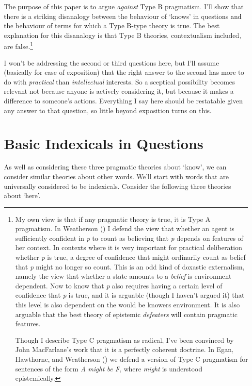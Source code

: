 \documentclass[
  10pt,
  letterpaper,
  DIV=11,
  numbers=noendperiod,
  twoside]{scrartcl}
\begin{document}
The purpose of this paper is to argue \emph{against} Type B pragmatism.
I'll show that there is a striking disanalogy between the behaviour of
`knows' in questions and the behaviour of terms for which a Type B-type
theory is true. The best explanation for this disanalogy is that Type B
theories, contextualism included, are false.\footnote{My own view is
  that if any pragmatic theory is true, it is Type A pragmatism. In
  Weatherson () I defend the
  view that whether an agent is sufficiently confident in \emph{p} to
  count as believing that \emph{p} depends on features of her context.
  In contexts where it is very important for practical deliberation
  whether \emph{p} is true, a degree of confidence that might ordinarily
  count as belief that \emph{p} might no longer so count. This is an odd
  kind of doxastic externalism, namely the view that whether a state
  amounts to a \emph{belief} is environment-dependent. Now to know that
  \emph{p} also requires having a certain level of confidence that
  \emph{p} is true, and it is arguable (though I haven't argued it) that
  this level is also dependent on the would be knowers environment. It
  is also arguable that the best theory of epistemic \emph{defeaters}
  will contain pragmatic features.

  Though I describe Type C pragmatism as radical, I've been convinced by
  John MacFarlane's work that it is a perfectly coherent doctrine. In
  Egan, Hawthorne, and Weatherson ()
  we defend a version of Type C pragmatism for sentences of the form
  \emph{A might be F}, where \emph{might} is understood epistemically.}

I won't be addressing the second or third questions here, but I'll
assume (basically for ease of exposition) that the right answer to the
second has more to do with \emph{practical} than \emph{intellectual}
interests. So a sceptical possibility becomes relevant not because
anyone is actively considering it, but because it makes a difference to
someone's actions. Everything I say here should be restatable given any
answer to that question, so little beyond exposition turns on this.

\section{Basic Indexicals in
Questions}\label{basic-indexicals-in-questions}

As well as considering these three pragmatic theories about `know', we
can consider similar theories about other words. We'll start with words
that are universally considered to be indexicals. Consider the following
three theories about `here'.
\end{document}
